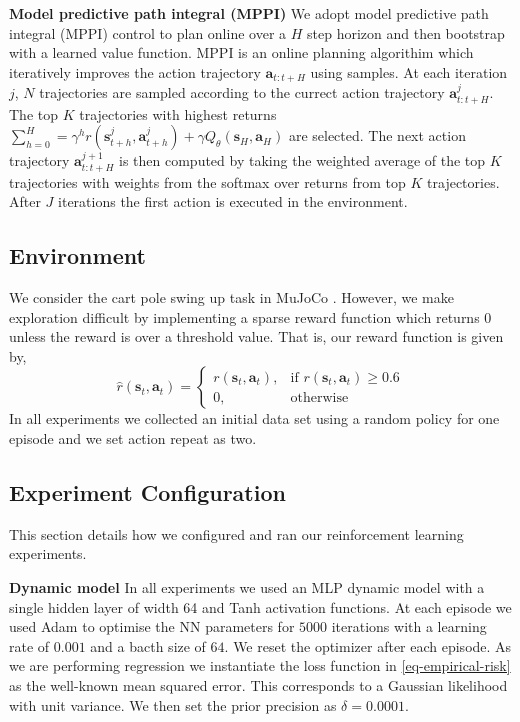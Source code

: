 \documentclass{article}
\newcommand{\state}{\ensuremath{\mathbf{s}}}
\newcommand{\action}{\ensuremath{\mathbf{a}}}
\newcommand{\Horizon}{\ensuremath{H}}
\begin{document}

\textbf{Model predictive path integral (MPPI)}
We adopt model predictive path integral (MPPI) control \cite{panSample2015,williamsModel2017}
to plan online over a $H$ step horizon and then bootstrap with a learned value function.
MPPI is an online planning algorithim which iteratively improves the action trajectory $\action_{t:t+H}$ using samples.
At each iteration $j$, $N$ trajectories are sampled according to the currect action trajectory $\action^{j}_{t:t+H}$.
The top $K$ trajectories with highest returns $\sum_{h=0}^{H} = \gamma^{h} r(\state^{j}_{t+h}, \action^{j}_{t+h}) + \gamma Q_{\theta}(\state_{\Horizon}, \action_{H})$ are selected.
The next action trajectory $\action^{j+1}_{t:t+H}$ is then computed by taking the weighted average of the top $K$ trajectories
with weights from the softmax over returns from top $K$ trajectories.
After $J$ iterations the first action is executed in the environment.


\subsection{Environment}
We consider the cart pole swing up task in MuJoCo \cite{todorov2012mujoco}.
However, we make exploration difficult by implementing a sparse reward function which returns $0$ unless the reward is over a threshold value. That is, our reward function is given by,
$$\hat{r}(\state_{t}, \action_{t}) =
\begin{cases}
    r(\state_{t}, \action_{t}),& \text{if } r(\state_{t}, \action_{t})\geq 0.6\\
    0,              & \text{otherwise}
\end{cases}
$$
In all experiments we collected an initial data set using a random policy for one episode and
we set action repeat as two.

\subsection{Experiment Configuration}
This section details how we configured and ran our reinforcement learning experiments.

\textbf{Dynamic model}
In all experiments we used an MLP dynamic model with a single hidden layer of width 64 and Tanh activation functions.
At each episode we used Adam \cite{adam} to optimise the NN parameters for $5000$ iterations with a learning rate of $0.001$ and a bacth size of $64$.
We reset the optimizer after each episode.
As we are performing regression we instantiate the loss function in \cref{eq-empirical-risk} as the well-known mean squared error.
This corresponds to a Gaussian likelihood with unit variance.
We then set the prior precision as $\delta=0.0001$.
\end{document}
